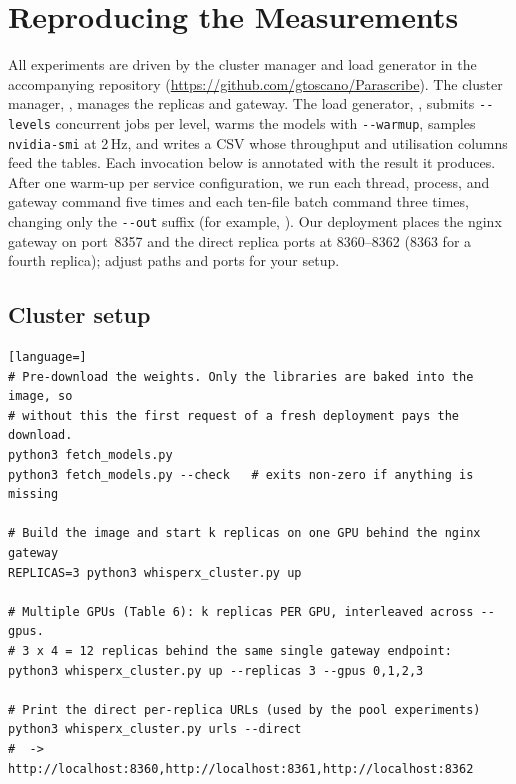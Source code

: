 \documentclass[10pt]{article}
\begin{document}
\appendix
\section{Reproducing the Measurements}
\label{app:repro}

All experiments are driven by the cluster manager and load generator in the
accompanying repository (\url{https://github.com/gtoscano/Parascribe}).
The cluster manager, , manages the replicas and
gateway. The load generator, , submits
\texttt{-{}-levels} concurrent jobs per level, warms the models with
\texttt{-{}-warmup}, samples \texttt{nvidia-smi} at 2\,Hz, and writes a CSV whose
throughput and utilisation columns feed the tables. Each invocation below is
annotated with the result it produces. After one warm-up per service
configuration, we run each thread, process, and gateway command five times and
each ten-file batch command three times, changing only the
\texttt{-{}-out} suffix (for example,
). Our deployment
places the nginx gateway
on port~8357 and the direct replica ports at 8360--8362 (8363 for a fourth
replica); adjust paths and ports for your setup.

\subsection{Cluster setup}
\begin{lstlisting}[language=]
# Pre-download the weights. Only the libraries are baked into the image, so
# without this the first request of a fresh deployment pays the download.
python3 fetch_models.py
python3 fetch_models.py --check   # exits non-zero if anything is missing

# Build the image and start k replicas on one GPU behind the nginx gateway
REPLICAS=3 python3 whisperx_cluster.py up

# Multiple GPUs (Table 6): k replicas PER GPU, interleaved across --gpus.
# 3 x 4 = 12 replicas behind the same single gateway endpoint:
python3 whisperx_cluster.py up --replicas 3 --gpus 0,1,2,3

# Print the direct per-replica URLs (used by the pool experiments)
python3 whisperx_cluster.py urls --direct
#  -> http://localhost:8360,http://localhost:8361,http://localhost:8362
\end{lstlisting}
\end{document}
